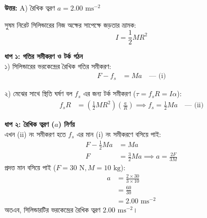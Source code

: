 \documentclass[12pt, a4paper]{article}
\begin{document}
\vspace{0.5em}
\begin{tcolorbox}[answerbox]
\textbf{\color{success} উত্তর:} A) রৈখিক ত্বরণ $a = 2.00\text{ ms}^{-2}$
\end{tcolorbox}
\vspace{1em}

\begin{tcolorbox}[solutionbox={সমাধান (Solution)}]
\noindent
সুষম নিরেট সিলিন্ডারের নিজ অক্ষের সাপেক্ষে জড়তার ভ্রামক:
\[I = \frac{1}{2} M R^2\]

\textbf{ধাপ ১: গতির সমীকরণ ও টর্ক গঠন} \\
১) সিলিন্ডারের ভরকেন্দ্রের রৈখিক গতির সমীকরণ:
\begin{align*}
    F - f_s &= M a \quad \text{--- (i)}
\end{align*}

২) মেঝের সাথে স্থিতি ঘর্ষণ বল $f_s$ এর জন্য টর্ক সমীকরণ ($\tau = f_s R = I \alpha$):
\begin{align*}
    f_s R &= \left(\frac{1}{2} M R^2\right) \left(\frac{a}{R}\right) \implies f_s = \frac{1}{2} M a \quad \text{--- (ii)}
\end{align*}

\vspace{0.5em}
\textbf{ধাপ ২: রৈখিক ত্বরণ ($a$) নির্ণয়} \\
এখন (ii) নং সমীকরণ হতে $f_s$ এর মান (i) নং সমীকরণে বসিয়ে পাই:
\begin{align*}
    F - \frac{1}{2} M a &= M a \\
    F &= \frac{3}{2} M a \implies a = \frac{2F}{3M}
\end{align*}
প্রদত্ত মান বসিয়ে পাই ($F = 30\text{ N}, M = 10\text{ kg}$):
\begin{align*}
    a &= \frac{2 \times 30}{3 \times 10} \\
      &= \frac{60}{30} \\
      &= \mathbf{2.00}\text{ ms}^{-2}
\end{align*}
অতএব, সিলিন্ডারটির ভরকেন্দ্রের রৈখিক ত্বরণ $2.00\text{ ms}^{-2}$।
\end{tcolorbox}
\end{document}

